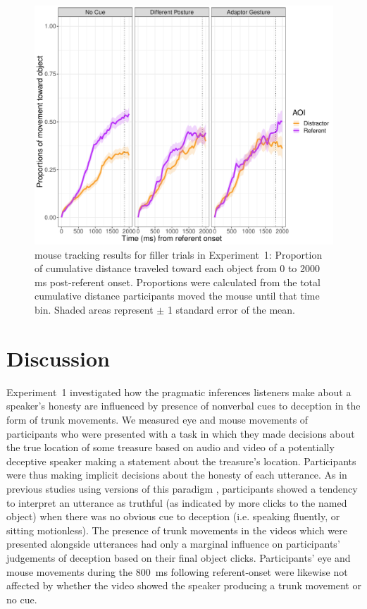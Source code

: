 \documentclass[a4paper,man,natbib]{apa6}
\begin{document}
\begin{figure}[Ht]
  \centering
	\includegraphics[width=\linewidth]{./img/e7_mouse_filler.pdf}
  \caption{mouse tracking results for filler trials in Experiment~1: Proportion of cumulative distance traveled toward each object from 0 to 2000 ms post-referent onset. Proportions were calculated from the total cumulative distance participants moved the mouse until that time bin. Shaded areas represent $\pm$ 1 standard error of the mean.}
  \label{fig:v1_mouse2}
\end{figure}

\section{Discussion}
Experiment~1 investigated how the pragmatic inferences listeners make about a speaker's honesty are influenced by presence of nonverbal cues to deception in the form of trunk movements.
We measured eye  and mouse  movements of participants who were presented with a task in which they made decisions about the true location of some treasure based on audio and video of a potentially deceptive speaker making a statement about the treasure's location.
Participants were thus making implicit decisions about the honesty of each utterance.
As in previous studies using versions of this paradigm \citep{Loy2017, King2018}, participants showed a tendency to interpret an utterance as truthful (as indicated by more clicks to the named object) when there was no obvious cue to deception (i.e. speaking fluently, or sitting motionless).
The presence of trunk movements in the videos which were presented alongside utterances had only a marginal influence on participants' judgements of deception based on their final object clicks.
Participants' eye  and mouse  movements during the 800~ms following referent-onset were likewise not affected by whether the video showed the speaker producing a trunk movement or no cue.
\end{document}
